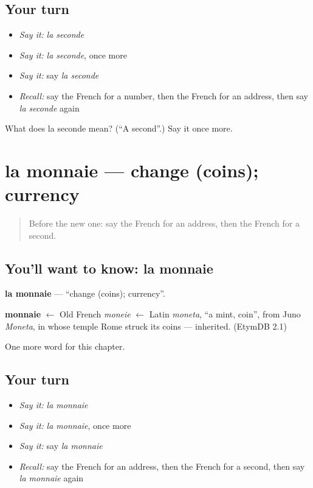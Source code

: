 \subsection*{Your turn}
\begin{itemize}
\raggedright
  \item \emph{Say it:} \emph{la seconde}
  \item \emph{Say it:} \emph{la seconde}, once more
  \item \emph{Say it:} say \emph{la seconde}
  \item \emph{Recall:} say the French for a number, then the French for an address, then say \emph{la seconde} again
\end{itemize}

\begin{tcolorbox}[breakable,colback=teal!4,colframe=teal!35!black,title={Before you move on}]
What does la seconde mean? (\textquotedblleft{}A second\textquotedblright{}.) Say it once more.
\end{tcolorbox}
\section[la monnaie]{la monnaie — change (coins); currency}

\label{lesson:FR-C135-monnaie}



\begin{quote}
Before the new one: say the French for an address, then the French for a second.
\end{quote}

\subsection*{You'll want to know: la monnaie}
\textbf{la monnaie} — \textquotedblleft{}change (coins); currency\textquotedblright{}.

\begin{cousinweb}
\textbf{monnaie} $\leftarrow$ Old French \emph{moneie} $\leftarrow$ Latin \emph{moneta}, \textquotedblleft{}a mint, coin\textquotedblright{}, from Juno \emph{Moneta}, in whose temple Rome struck its coins — inherited. (EtymDB 2.1)
\end{cousinweb}

\begin{grammarlens}[title={What you've built}]
One more word for this chapter.
\end{grammarlens}

\subsection*{Your turn}
\begin{itemize}
\raggedright
  \item \emph{Say it:} \emph{la monnaie}
  \item \emph{Say it:} \emph{la monnaie}, once more
  \item \emph{Say it:} say \emph{la monnaie}
  \item \emph{Recall:} say the French for an address, then the French for a second, then say \emph{la monnaie} again
\end{itemize}

